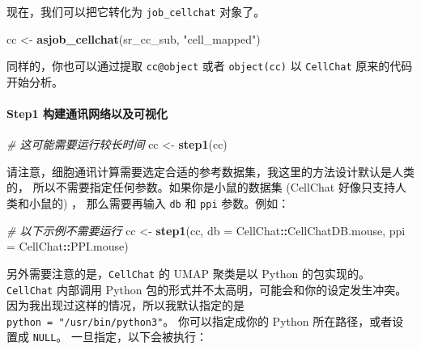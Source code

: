 \documentclass[
]{article}
\newenvironment{Shaded}{\begin{snugshade}}{\end{snugshade}}
\newcommand{\CommentTok}[1]{\textcolor[rgb]{0.56,0.35,0.01}{\textit{#1}}}
\newcommand{\DataTypeTok}[1]{\textcolor[rgb]{0.13,0.29,0.53}{#1}}
\newcommand{\KeywordTok}[1]{\textcolor[rgb]{0.13,0.29,0.53}{\textbf{#1}}}
\newcommand{\NormalTok}[1]{#1}
\newcommand{\OperatorTok}[1]{\textcolor[rgb]{0.81,0.36,0.00}{\textbf{#1}}}
\newcommand{\StringTok}[1]{\textcolor[rgb]{0.31,0.60,0.02}{#1}}
\begin{document}
现在，我们可以把它转化为 \texttt{job\_cellchat} 对象了。

\begin{Shaded}
\begin{Highlighting}[]
\NormalTok{cc \textless{}{-}}\StringTok{ }\KeywordTok{asjob\_cellchat}\NormalTok{(sr\_cc\_sub, }\StringTok{"cell\_mapped"}\NormalTok{)}
\end{Highlighting}
\end{Shaded}

同样的，你也可以通过提取 \texttt{cc@object} 或者 \texttt{object(cc)} 以 \texttt{CellChat} 原来的代码开始分析。

\hypertarget{step1-ux6784ux5efaux901aux8bafux7f51ux7edcux4ee5ux53caux53efux89c6ux5316}{%
\paragraph{Step1 构建通讯网络以及可视化}\label{step1-ux6784ux5efaux901aux8bafux7f51ux7edcux4ee5ux53caux53efux89c6ux5316}}

\begin{Shaded}
\begin{Highlighting}[]
\CommentTok{\# 这可能需要运行较长时间}
\NormalTok{cc \textless{}{-}}\StringTok{ }\KeywordTok{step1}\NormalTok{(cc)}
\end{Highlighting}
\end{Shaded}

请注意，细胞通讯计算需要选定合适的参考数据集，我这里的方法设计默认是人类的，
所以不需要指定任何参数。如果你是小鼠的数据集 (CellChat 好像只支持人类和小鼠的) ，
那么需要再输入 \texttt{db} 和 \texttt{ppi} 参数。例如：

\begin{Shaded}
\begin{Highlighting}[]
\CommentTok{\# 以下示例不需要运行}
\NormalTok{cc \textless{}{-}}\StringTok{ }\KeywordTok{step1}\NormalTok{(cc, }\DataTypeTok{db =}\NormalTok{ CellChat}\OperatorTok{::}\NormalTok{CellChatDB.mouse, }\DataTypeTok{ppi =}\NormalTok{ CellChat}\OperatorTok{::}\NormalTok{PPI.mouse)}
\end{Highlighting}
\end{Shaded}

另外需要注意的是，\texttt{CellChat} 的 UMAP 聚类是以 Python 的包实现的。
\texttt{CellChat} 内部调用 Python 包的形式并不太高明，可能会和你的设定发生冲突。
因为我出现过这样的情况，所以我默认指定的是 \texttt{python\ =\ "/usr/bin/python3"}。
你可以指定成你的 Python 所在路径，或者设置成 \texttt{NULL}。
一旦指定，以下会被执行：
\end{document}
